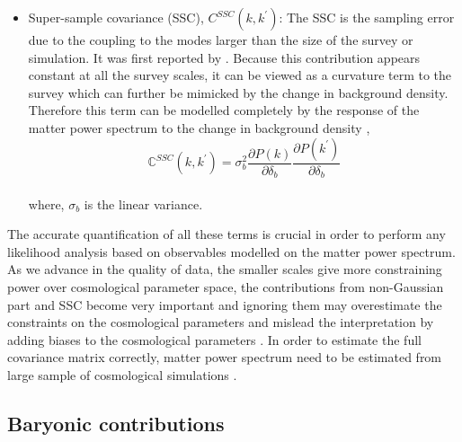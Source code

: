 \begin{itemize}
	\item Super-sample covariance (SSC), $C^{SSC}(k,k^{\prime})$: The SSC is the sampling
			error due to the coupling to the modes larger than the size of the survey or
			simulation. It was first reported by \cite{2006MNRAS.371.1188H}.
			Because this contribution appears constant at all the survey scales, it 
			can be viewed as a curvature term to the survey which can further be mimicked 
			by the change in background density. Therefore this term can be modelled
			completely by the response of the matter power spectrum to the 
			change in background density \cite{2013PhRvD..87l3504T,2014PhRvD..90j3530L},
			\begin{equation}
				\mathbb{C}^{SSC}(k,k^{\prime}) = \sigma_b^2 \dfrac{\partial P(k)}{\partial \delta_b}
										\dfrac{\partial P(k^{\prime})}{\partial \delta_b}
			\end{equation}
			\\
			where, $\sigma_b$ is the linear variance. 
\end{itemize}

The accurate quantification of all these terms is crucial in order to perform any
likelihood analysis based on observables modelled on the matter power spectrum. As we
advance in the quality of data, the smaller scales give more constraining power 
over cosmological parameter space, the contributions from non-Gaussian part and SSC
become very important and ignoring them may overestimate the constraints on the 
cosmological parameters and mislead the interpretation by adding biases to the
cosmological parameters 
\cite{2000ApJ...537....1W,2007MNRAS.375L...6S,2008ApJ...686L...1L,2009MNRAS.395.2065T,2011MNRAS.416.1045K}.
In order to estimate the full covariance matrix correctly, matter power spectrum
need to be estimated from large sample of cosmological simulations
\cite{2013MNRAS.432.1928T,2009ApJ...700..479T,2015MNRAS.446.1756B}.


\subsection{Baryonic contributions}\label{sec:baryons}

